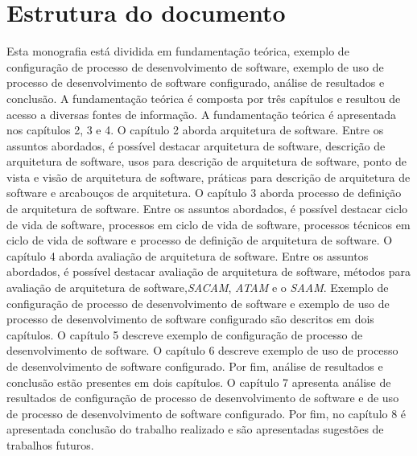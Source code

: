 \section{Estrutura do documento}

Esta monografia está dividida em fundamentação teórica, exemplo de configuração de processo de desenvolvimento de software, exemplo de uso de processo de desenvolvimento de software configurado, análise de resultados e conclusão. A fundamentação teórica é composta por três capítulos e resultou de acesso a diversas fontes de informação. A fundamentação teórica é apresentada nos capítulos 2, 3 e 4. O capítulo 2 aborda arquitetura de software. Entre os assuntos abordados, é possível destacar arquitetura de software, descrição de arquitetura de software, usos para descrição de arquitetura de software, ponto de vista e visão de arquitetura de software, práticas para descrição de arquitetura de software e arcabouços de arquitetura. O capítulo 3 aborda processo de definição de arquitetura de software. Entre os assuntos abordados, é possível destacar ciclo de vida de software, processos em ciclo de vida de software, processos técnicos em ciclo de vida de software e processo de definição de arquitetura de software. O capítulo 4 aborda avaliação de arquitetura de software. Entre os assuntos abordados, é possível destacar avaliação de arquitetura de software, métodos para avaliação de arquitetura de software,\emph{\acrfull{SACAM}}, \emph{\acrfull{ATAM}} e o \emph{\acrfull{SAAM}}. Exemplo de configuração de processo de desenvolvimento de software e exemplo de uso de processo de desenvolvimento de software configurado são descritos em dois capítulos. O capítulo 5 descreve exemplo de configuração de processo de desenvolvimento de software. O capítulo 6 descreve exemplo de uso de processo de desenvolvimento de software configurado. Por fim, análise de resultados e conclusão estão presentes em dois capítulos. O capítulo 7 apresenta análise de resultados de configuração de processo de desenvolvimento de software e de uso de processo de desenvolvimento de software configurado. Por fim, no capítulo 8 é apresentada conclusão do trabalho realizado e são apresentadas sugestões de trabalhos futuros.
